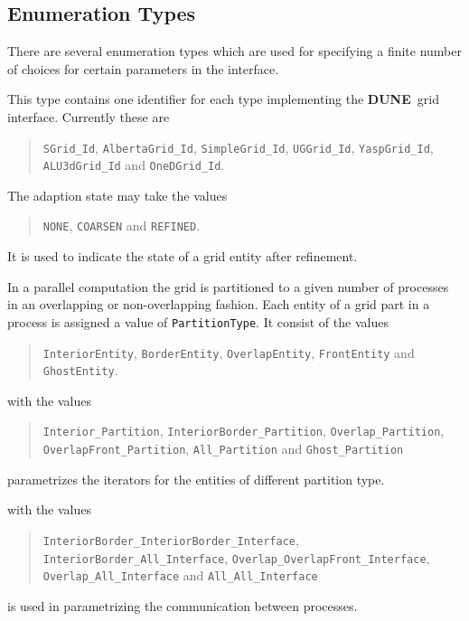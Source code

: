 \documentclass[11pt,a4paper,headinclude,footinclude,DIV14,BCOR8.25mm,titlepage,twoside,openright,normalheadings]{scrreprt}
\newcommand{\Dune}{{\sf\bfseries DUNE}}
\begin{document}
\subsection{Enumeration Types}

There are several enumeration types which are used for specifying a
finite number of choices for certain parameters in the interface.

 This type contains one identifier for each
type implementing the \Dune\ grid interface. Currently these are
\begin{quote}
\raggedright
\lstinline!SGrid_Id!, \lstinline!AlbertaGrid_Id!, \lstinline!SimpleGrid_Id!, \lstinline!UGGrid_Id!, 
\lstinline!YaspGrid_Id!, \lstinline!ALU3dGrid_Id! and \lstinline!OneDGrid_Id!.
\end{quote}

The adaption state may take the values
\begin{quote}
\raggedright
\lstinline!NONE!, \lstinline!COARSEN! and \lstinline!REFINED!.
\end{quote}
It is used to indicate the state of a grid entity after refinement.


In a parallel computation the grid is partitioned to a given number of
processes in an overlapping or non-overlapping fashion. Each entity of
a grid part in a process is assigned a value of
\lstinline!PartitionType!. It consist of the values
\begin{quote}
\raggedright
\lstinline!InteriorEntity!, \lstinline!BorderEntity!,
\lstinline!OverlapEntity!, \lstinline!FrontEntity! and
\lstinline!GhostEntity!.
\end{quote}


with the values
\begin{quote}
\raggedright
\lstinline!Interior_Partition!,
\lstinline!InteriorBorder_Partition!,
\lstinline!Overlap_Partition!,
\lstinline!OverlapFront_Partition!,
\lstinline!All_Partition! and
\lstinline!Ghost_Partition!
\end{quote}
parametrizes the iterators for the entities of different partition
type.

with the values
\begin{quote}
\raggedright
\lstinline!InteriorBorder_InteriorBorder_Interface!,
\lstinline!InteriorBorder_All_Interface!,
\lstinline!Overlap_OverlapFront_Interface!,
\lstinline!Overlap_All_Interface! and
\lstinline!All_All_Interface!
\end{quote}
is used in parametrizing the communication between processes.
\end{document}
